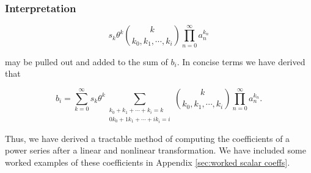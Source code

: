 
\subsubsection{Interpretation}

\begin{equation*}
    s_k \theta^k \binom{k}{k_0, k_1, \cdots, k_i} \prod_{n=0}^{\infty} a_n^{k_n}
\end{equation*}

may be pulled out and added to the sum of $b_i$. In concise terms we have derived that

\begin{equation}
    b_i = \sum_{k=0}^{\infty} s_k \theta^k \sum_{\substack{k_0 + k_1 + \cdots + k_i = k \\ 0 k_0 + 1 k_1 + \cdots + i k_i = i}} \binom{k}{k_0, k_1, \cdots, k_i} \prod_{n=0}^{\infty} a_n^{k_n}.
	\label{eqn:scalar power series result}
\end{equation}

Thus, we have derived a tractable method of computing the coefficients of a power series after a linear and nonlinear transformation. We have included some worked examples of these coefficients in Appendix \ref{sec:worked scalar coeffs}.
